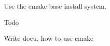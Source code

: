 Use the cmake base install system.

\begin{DoxyRefDesc}{Todo}
\item[{\bf Todo}]Write docu, how to use cmake\end{DoxyRefDesc}
